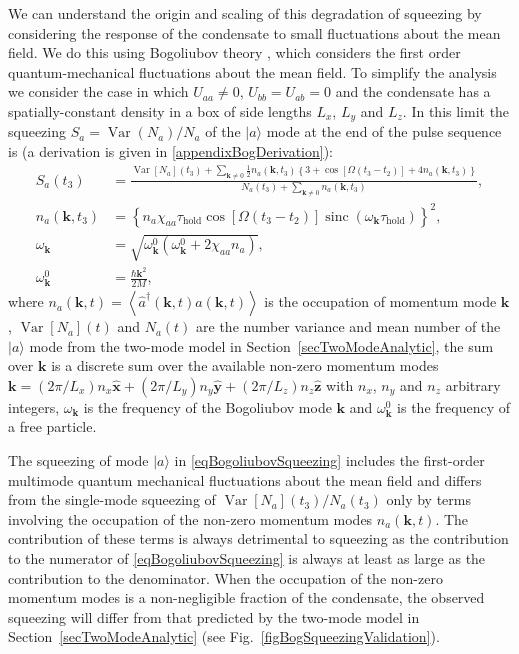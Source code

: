 \documentclass{iopart}
\DeclareMathOperator{\Var}{Var}
\DeclareMathOperator{\sinc}{sinc}
\newcommand{\expect}[1]{\ensuremath{\left<#1\right>}}
\begin{document}
We can understand the origin and scaling of this degradation of squeezing by considering the response of the condensate to small fluctuations about the mean field.  We do this using Bogoliubov theory \cite{PethickSmith}, which considers the first order quantum-mechanical fluctuations about the mean field.  To simplify the analysis we consider the case in which $U_{aa} \neq 0$, $U_{bb}=U_{ab} = 0$ and the condensate has a spatially-constant density in a box of side lengths $L_x$, $L_y$ and $L_z$.  In this limit the squeezing $S_a = \Var(N_a)/N_a$ of the $|a\rangle$ mode at the end of the pulse sequence is (a derivation is given in \ref{appendixBogDerivation}):
\begin{align}
  S_a(t_3) &= \frac{\Var[N_a](t_3) + \sum_{\mathbf{k}\neq 0} \frac{1}{2} n_a(\mathbf{k}, t_3) \left\{3 + \cos\left[\Omega(t_3-t_2)\right] + 4 n_a(\mathbf{k}, t_3)\right\}}{N_a(t_3) + \sum_{\mathbf{k}\neq 0} n_a(\mathbf{k}, t_3)}, \label{eqBogoliubovSqueezing}\\
  n_a(\mathbf{k}, t_3) &= \left\{n_a \chi_{aa} \tau_\text{hold} \cos\left[\Omega\left(t_3-t_2\right)\right] \sinc\left(\omega_\mathbf{k} \tau_\text{hold}\right) \right\}^2,\\
  \omega_\mathbf{k} &= \sqrt{\omega^0_\mathbf{k}(\omega^0_\mathbf{k} + 2 \chi_{aa} n_a)}, \\
  \omega^0_\mathbf{k} &= \frac{\hbar \mathbf{k}^2}{2 M},
\end{align}
where $n_a(\mathbf{k}, t) = \expect{\hat{a}^\dagger(\mathbf{k}, t) \hat{a}(\mathbf{k}, t)}$ is the occupation of momentum mode $\mathbf{k}$, $\Var[N_a](t)$ and $N_a(t)$ are the number variance and mean number of the $|a\rangle$ mode from the two-mode model in Section~\ref{secTwoModeAnalytic}, the sum over $\mathbf{k}$ is a discrete sum over the available non-zero momentum modes $\mathbf{k} = (2\pi/L_x) n_x \hat{\mathbf{x}} + (2\pi/L_y) n_y \hat{\mathbf{y}} + (2\pi/L_z) n_z \hat{\mathbf{z}}$ with $n_x$, $n_y$ and $n_z$ arbitrary integers, $\omega_\mathbf{k}$ is the frequency of the Bogoliubov mode $\mathbf{k}$ and $\omega^0_\mathbf{k}$ is the frequency of a free particle.

The squeezing of mode $|a\rangle$ in \eqref{eqBogoliubovSqueezing} includes the first-order multimode quantum mechanical fluctuations about the mean field and differs from the single-mode squeezing of $\Var[N_a](t_3)/N_a(t_3)$ only by terms involving the occupation of the non-zero momentum modes $n_a(\mathbf{k}, t)$.  The contribution of these terms is always detrimental to squeezing as the contribution to the numerator of \eqref{eqBogoliubovSqueezing} is always at least as large as the contribution to the denominator.  When the occupation of the non-zero momentum modes is a non-negligible fraction of the condensate, the observed squeezing will differ from that predicted by the two-mode model in Section~\ref{secTwoModeAnalytic} (see Fig.~\ref{figBogSqueezingValidation}).  
\end{document}
